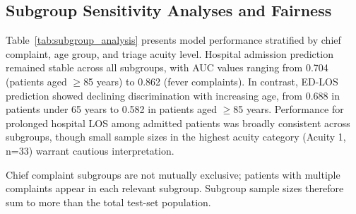 \documentclass[harvard,article]{frontiersinFPHY_FAMS}
\begin{document}
\subsection{Subgroup Sensitivity Analyses and Fairness}

Table~\ref{tab:subgroup_analysis} presents model performance stratified by chief complaint, age group, and triage acuity level. Hospital admission prediction remained stable across all subgroups, with AUC values ranging from 0.704 (patients aged $\geq$85 years) to 0.862 (fever complaints). In contrast, ED-LOS prediction showed declining discrimination with increasing age, from 0.688 in patients under 65 years to 0.582 in patients aged $\geq$85 years. Performance for prolonged hospital LOS among admitted patients was broadly consistent across subgroups, though small sample sizes in the highest acuity category (Acuity 1, n=33) warrant cautious interpretation.

Chief complaint subgroups are not mutually exclusive; patients with multiple complaints appear in each relevant subgroup. Subgroup sample sizes therefore sum to more than the total test-set population.
\end{document}
